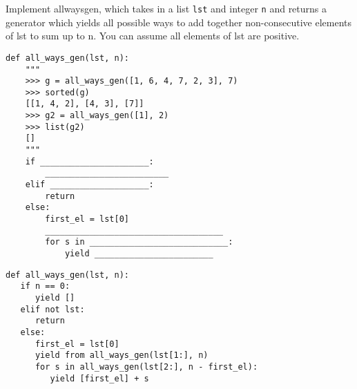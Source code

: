\begin{blocksection}
\question Implement all\textunderscore ways\textunderscore gen, which takes in a list \texttt{lst} and integer \texttt{n} and returns a generator which yields all possible ways to add together non-consecutive elements of lst to sum up to n. You can assume all elements of lst are positive.
\newline
\begin{lstlisting}
def all_ways_gen(lst, n):
    """
    >>> g = all_ways_gen([1, 6, 4, 7, 2, 3], 7)
    >>> sorted(g)
    [[1, 4, 2], [4, 3], [7]]
    >>> g2 = all_ways_gen([1], 2)
    >>> list(g2)
    []
    """
    if ______________________:
        _________________________
    elif ____________________:
        return
    else:
        first_el = lst[0]
        ____________________________________
        for s in ____________________________:
            yield ________________________
\end{lstlisting}
\begin{solution}
\begin{lstlisting}
def all_ways_gen(lst, n):
   if n == 0:
      yield []
   elif not lst:
      return
   else:
      first_el = lst[0]
      yield from all_ways_gen(lst[1:], n)
      for s in all_ways_gen(lst[2:], n - first_el):
         yield [first_el] + s
\end{lstlisting}
\end{solution}
\end{blocksection}
